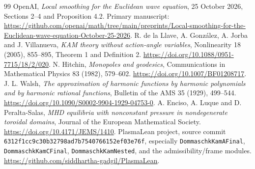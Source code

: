 \documentclass[11pt]{article}
\begin{document}
\begin{thebibliography}{99}
 OpenAI, \emph{Local smoothing for the Euclidean wave equation}, 25 October 2026, Sections 2--4 and Proposition 4.2. Primary manuscript: \url{https://github.com/openai/math/tree/main/preprints/Local-smoothing-for-the-Euclidean-wave-equation-October-25-2026}.
 R. de la Llave, A. González, A. Jorba and J. Villanueva, \emph{KAM theory without action-angle variables}, Nonlinearity 18 (2005), 855--895, Theorem 1 and Definition 2. \url{https://doi.org/10.1088/0951-7715/18/2/020}.
 N. Hitchin, \emph{Monopoles and geodesics}, Communications in Mathematical Physics 83 (1982), 579--602. \url{https://doi.org/10.1007/BF01208717}.
 J. L. Walsh, \emph{The approximation of harmonic functions by harmonic polynomials and by harmonic rational functions}, Bulletin of the AMS 35 (1929), 499--544. \url{https://doi.org/10.1090/S0002-9904-1929-04753-0}.
 A. Enciso, A. Luque and D. Peralta-Salas, \emph{MHD equilibria with nonconstant pressure in nondegenerate toroidal domains}, Journal of the European Mathematical Society. \url{https://doi.org/10.4171/JEMS/1410}.
 PlasmaLean project, source commit \texttt{6312f1cc9c30b32798ad7b7540766152ef03e76f}, especially \texttt{DommaschkKamAFinal}, \texttt{DommaschkKamCFinal}, \texttt{DommaschkKamNested}, and the admissibility/frame modules. \url{https://github.com/siddhartha-gadgil/PlasmaLean}.
\end{thebibliography}
\end{document}
